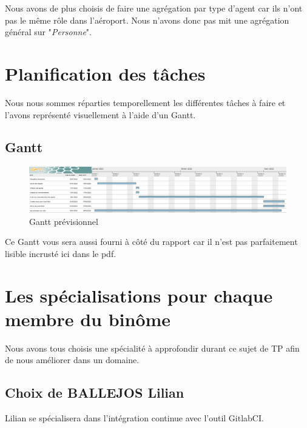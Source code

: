 \documentclass[12pt,french]{article} %
\begin{document}
Nous avons de plus choisis de faire une agrégation par type d'agent car ils n'ont pas le même rôle dans l'aéroport. Nous n'avons donc pas mit une agrégation général sur "\textit{Personne}". 


\section{Planification des tâches}

Nous nous sommes réparties temporellement les différentes tâches à faire et l'avons représenté visuellement à l'aide d'un Gantt.

\subsection{Gantt}

\begin{figure}[H]
	\centering
	\includegraphics[scale=0.35]{gantt.png}
	\caption{Gantt prévisionnel}    
\end{figure}

\bigskip

Ce Gantt vous sera aussi fourni à côté du rapport car il n'est pas parfaitement lisible incrusté ici dans le pdf.

\section{Les spécialisations pour chaque membre du binôme}

Nous avons tous choisis une spécialité à approfondir durant ce sujet de TP afin de nous améliorer dans un domaine.

\subsection{Choix de BALLEJOS Lilian}

Lilian se spécialisera dans l'intégration continue avec l'outil GitlabCI.
\end{document}
